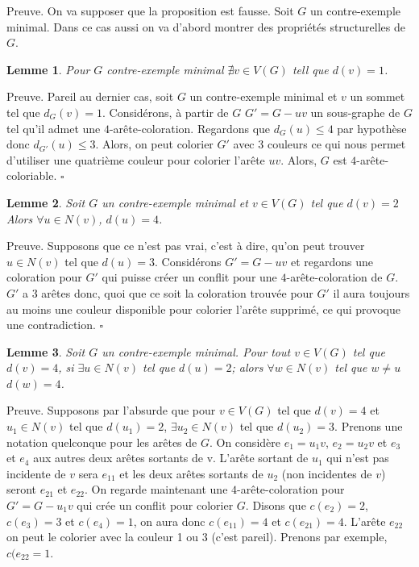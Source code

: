 \documentclass[10pt,a4paper]{article}
\newtheorem{lemme}{Lemme}
\newcommand{\ep}{{\hfill $\square$}}
\begin{document}
Preuve. On va supposer que la proposition est fausse. Soit $G$ un contre-exemple minimal. Dans ce cas aussi on va d'abord montrer des propriétés structurelles de $G$.

\begin{lemme}
Pour $G$ contre-exemple minimal $\nexists v \in V(G)$ tell que $d(v) = 1$.
\end{lemme}

Preuve.
Pareil au dernier cas, soit $G$ un contre-exemple minimal et $v$ un sommet tel que $d_G(v) = 1$. Considérons, à partir de $G$ $G' = G-uv$ un sous-graphe de $G$ tel qu'il admet une $4$-arête-coloration. Regardons que $d_G(u) \leq 4$ par hypothèse donc $d_{G'}(u) \leq 3$. Alors, on peut colorier $G'$ avec $3$ couleurs ce qui nous permet d'utiliser une quatrième couleur pour colorier l'arête $uv$. Alors, $G$ est $4$-arête-coloriable.
\ep

\begin{lemme}
Soit $G$ un contre-exemple minimal et $v \in V(G)$ tel que $d(v) = 2$ Alors $\forall u \in N(v)$, $d(u) = 4$.
\end{lemme} 

Preuve.
Supposons que ce n'est pas vrai, c'est à dire, qu'on peut trouver $u \in N(v)$ tel que $d(u) = 3$. Considérons $G' = G-uv$ et regardons une coloration pour $G'$ qui puisse créer un conflit pour une $4$-arête-coloration de $G$. $G'$ a 3 arêtes donc, quoi que ce soit la coloration trouvée pour $G'$ il aura toujours au moins une couleur disponible pour colorier l'arête supprimé, ce qui provoque une contradiction.
\ep

\begin{lemme}
Soit $G$ un contre-exemple minimal. Pour tout $v \in V(G)$ tel que $d(v) = 4$, si $\exists u \in N(v)$ tel que $d(u) = 2$; alors $\forall w \in N(v)$ tel que $w \neq u$ $d(w) = 4$.
\end{lemme}

Preuve.
Supposons par l'absurde que pour $v \in V(G)$ tel que $d(v) = 4$ et $u_1 \in N(v)$ tel que $d(u_1) = 2$, $\exists u_2 \in N(v)$ tel que $d(u_2) = 3$. Prenons une notation quelconque pour les arêtes de $G$. On considère $e_1 = u_1v$, $e_2 = u_2v$ et $e_3$ et $e_4$ aux autres deux arêtes sortants de v. L'arête sortant de $u_1$ qui n'est pas incidente de $v$ sera $e_{11}$ et les deux arêtes sortants de $u_2$ (non incidentes de $v$) seront $e_{21}$ et $e_{22}$. On regarde maintenant une $4$-arête-coloration pour $G' = G-u_1v$ qui crée un conflit pour colorier $G$. Disons que $c(e_2)=2$, $c(e_3)=3$ et $c(e_4)=1$, on aura donc $c(e_{11})=4$ et $c(e_{21})=4$. L'arête $e_{22}$ on peut le colorier avec la couleur 1 ou 3 (c'est pareil). Prenons par exemple, $c(e_{22} = 1$.
\end{document}
